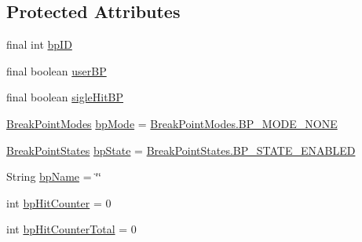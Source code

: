 \subsection*{Protected Attributes}
\begin{DoxyCompactItemize}
\item 
final int \hyperlink{classgov_1_1nasa_1_1jpf_1_1inspector_1_1server_1_1breakpoints_1_1_internal_breakpoint_holder_a26871ae9ddbbed5528823aa21aea0e66}{bp\+ID}
\item 
final boolean \hyperlink{classgov_1_1nasa_1_1jpf_1_1inspector_1_1server_1_1breakpoints_1_1_internal_breakpoint_holder_a3e610f11675553b389c51a824b68a69d}{user\+BP}
\item 
final boolean \hyperlink{classgov_1_1nasa_1_1jpf_1_1inspector_1_1server_1_1breakpoints_1_1_internal_breakpoint_holder_aa0cfc4131f194e774b1dcf635a954c32}{sigle\+Hit\+BP}
\item 
\hyperlink{enumgov_1_1nasa_1_1jpf_1_1inspector_1_1server_1_1breakpoints_1_1_break_point_modes}{Break\+Point\+Modes} \hyperlink{classgov_1_1nasa_1_1jpf_1_1inspector_1_1server_1_1breakpoints_1_1_internal_breakpoint_holder_ac8bf5e02209c06e229e351c1ec6bedca}{bp\+Mode} = \hyperlink{enumgov_1_1nasa_1_1jpf_1_1inspector_1_1server_1_1breakpoints_1_1_break_point_modes_a60e94673a7e82fdef5b76d904bd77a02}{Break\+Point\+Modes.\+B\+P\+\_\+\+M\+O\+D\+E\+\_\+\+N\+O\+NE}
\item 
\hyperlink{enumgov_1_1nasa_1_1jpf_1_1inspector_1_1interfaces_1_1_break_point_states}{Break\+Point\+States} \hyperlink{classgov_1_1nasa_1_1jpf_1_1inspector_1_1server_1_1breakpoints_1_1_internal_breakpoint_holder_abae042163d5f5ba2f139af374333eb10}{bp\+State} = \hyperlink{enumgov_1_1nasa_1_1jpf_1_1inspector_1_1interfaces_1_1_break_point_states_a5d9fa5a184b9ce97df2f84151f78116d}{Break\+Point\+States.\+B\+P\+\_\+\+S\+T\+A\+T\+E\+\_\+\+E\+N\+A\+B\+L\+ED}
\item 
String \hyperlink{classgov_1_1nasa_1_1jpf_1_1inspector_1_1server_1_1breakpoints_1_1_internal_breakpoint_holder_a4d851deec41452b5dcb7111ffc99174f}{bp\+Name} = \char`\"{}\char`\"{}
\item 
int \hyperlink{classgov_1_1nasa_1_1jpf_1_1inspector_1_1server_1_1breakpoints_1_1_internal_breakpoint_holder_aec846067d31df66ea565a3e8bd4e0020}{bp\+Hit\+Counter} = 0
\item 
int \hyperlink{classgov_1_1nasa_1_1jpf_1_1inspector_1_1server_1_1breakpoints_1_1_internal_breakpoint_holder_aa6339c33fa2fa9bb89094609ae7ec656}{bp\+Hit\+Counter\+Total} = 0
\item 

\end{DoxyCompactItemize}
